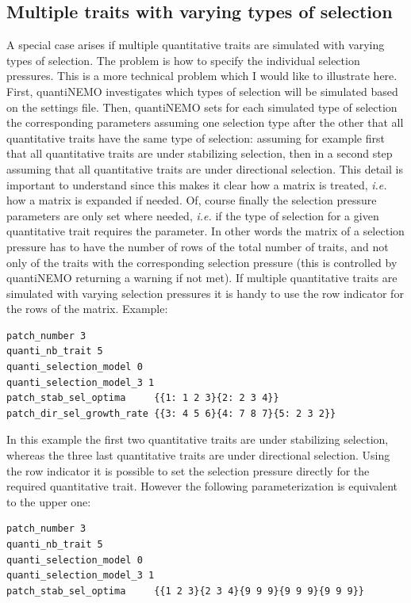 \documentclass[letterpaper,12pt,oneside]{book}
\begin{document}
\begin{appendices}
\chapter{Multiple traits with varying types of selection}
A special case arises if multiple quantitative traits are simulated with varying types of selection. The problem is how to specify the individual selection pressures. This is a more technical problem which I would like to illustrate here. First, quantiNEMO investigates which types of selection will be simulated based on the settings file. Then, quantiNEMO sets for each simulated type of selection the corresponding parameters assuming one selection type after the other that all quantitative traits have the same type of selection: assuming for example first that all quantitative traits are under stabilizing selection, then in a second step assuming that all quantitative traits are under directional selection. This detail is important to understand since this makes it clear how a matrix is treated, \textit{i.e.} how a matrix is expanded if needed. Of, course finally the selection pressure parameters are only set where needed, \textit{i.e.} if the type of selection for a given quantitative trait requires the parameter. In other words the matrix of a selection pressure has to have the number of rows of the total number of traits, and not only of the traits with the corresponding selection pressure (this is controlled by quantiNEMO returning a warning if not met). If multiple quantitative traits are simulated with varying selection pressures it is handy to use the row indicator for the rows of the matrix. Example:
\begin{lstlisting}[frame=single]
patch_number 3
quanti_nb_trait 5 
quanti_selection_model 0	
quanti_selection_model_3 1
patch_stab_sel_optima     {{1: 1 2 3}{2: 2 3 4}}
patch_dir_sel_growth_rate {{3: 4 5 6}{4: 7 8 7}{5: 2 3 2}}
\end{lstlisting}
In this example the first two quantitative traits are under stabilizing selection, whereas the three last quantitative traits are under directional selection. Using the row indicator it is possible to set the selection pressure directly for the required quantitative trait. However the following parameterization is equivalent to the upper one:
\begin{lstlisting}[frame=single]
patch_number 3
quanti_nb_trait 5 
quanti_selection_model 0	
quanti_selection_model_3 1
patch_stab_sel_optima     {{1 2 3}{2 3 4}{9 9 9}{9 9 9}{9 9 9}}

\end{lstlisting}
\end{appendices}
\end{document}
